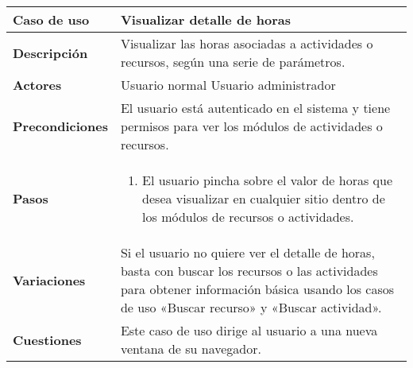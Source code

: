 \begin{tabular}{|p{1.25in}|p{3.65in}|}\hline
\textbf{Caso de uso} & \textbf{Visualizar detalle de horas}\\\hline\hline
\textbf{Descripción} & Visualizar las horas asociadas a actividades o recursos,
según una serie de parámetros. \\\hline
\textbf{Actores} & Usuario normal \newline Usuario administrador\\\hline
\textbf{Precondiciones} & El usuario está autenticado en el sistema y
tiene permisos para ver los módulos de actividades o recursos.\\\hline
\textbf{Pasos} & 
  \begin{enumerate}
   \item El usuario pincha sobre el valor de horas que desea visualizar en
cualquier sitio dentro de los módulos de recursos o actividades.
  \end{enumerate}
\\\hline
\textbf{Variaciones} & Si el usuario no quiere ver el detalle de horas,
basta con buscar los recursos o las actividades para obtener información
básica usando los casos de uso «Buscar recurso» y «Buscar actividad».\\\hline
\textbf{Cuestiones} & Este caso de uso dirige al usuario a una nueva
ventana de su navegador.\\\hline
\end{tabular}

